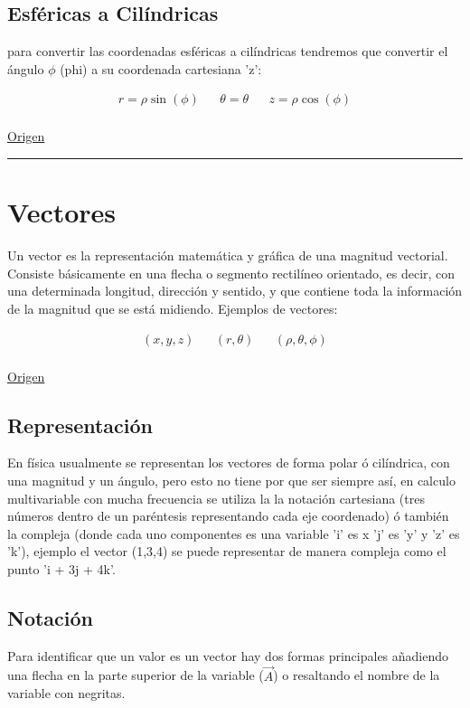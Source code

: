 \documentclass{article}
\begin{document}
\subsection{Esféricas a Cilíndricas}
\label{sec:org23ad447}
para convertir las coordenadas esféricas a cilíndricas tendremos que convertir el ángulo \(\phi\) (phi) a su coordenada cartesiana 'z':

\[\begin{aligned}
 r = \rho \sin(\phi) && 
 \theta = \theta &&
 z = \rho \cos(\phi) \\
\end{aligned}\] 

\href{https://temasdecalculo.com/2017/12/18/4-14-coordenadas-cilindricas-y-coordenadas-esfericas-calculo-vectorial/}{Origen}

\noindent\rule{\textwidth}{0.5pt}

\section{Vectores}
\label{sec:orgd9f7647}
Un vector es la representación matemática y gráfica de una magnitud vectorial. Consiste básicamente en una flecha o segmento rectilíneo orientado, es decir, con una determinada longitud, dirección y sentido, y que contiene toda la información de la magnitud que se está midiendo. Ejemplos de vectores: 

\[\begin{aligned}
  (x,y,z) && (r,\theta) && (\rho, \theta, \phi) \\
\end{aligned}\] 

\href{https://ingemecanica.com/tutoriales/calculo\_vectorial.html}{Origen}

\subsection{Representación}
\label{sec:orgb5bdf31}
En física usualmente se representan los vectores de forma polar ó cilíndrica, con una magnitud y un ángulo, pero esto no tiene por que ser siempre así, en calculo multivariable con mucha frecuencia se utiliza la la notación cartesiana (tres números dentro de un paréntesis representando cada eje coordenado) ó también la compleja (donde cada uno componentes es una variable 'i' es x 'j' es 'y' y 'z' es 'k'), ejemplo el vector (1,3,4) se puede representar de manera compleja como el punto 'i + 3j + 4k'. 

\subsection{Notación}
\label{sec:org4017af6}
Para identificar que un valor es un vector hay dos formas principales añadiendo una flecha en la parte superior de la variable (\(\vec{A}\)) o resaltando el nombre de la variable con negritas. 
\end{document}

